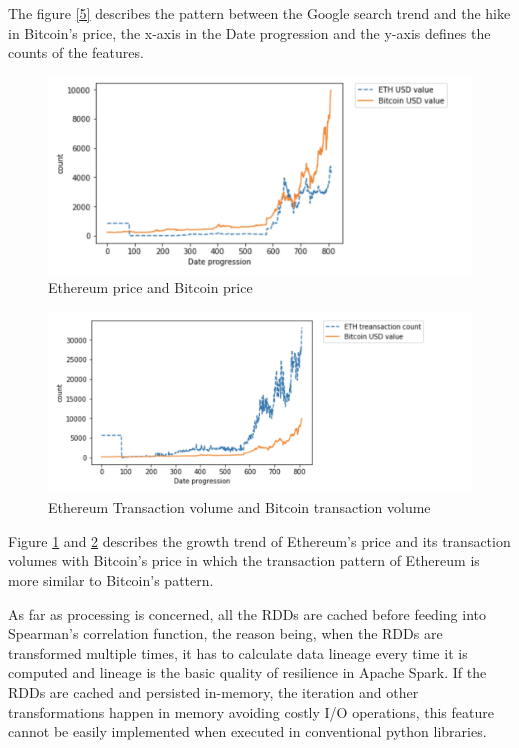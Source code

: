 \documentclass[sigconf]{acmart}
\begin{document}
The figure \ref{5} describes the pattern between the Google search trend and the hike in Bitcoin's price, the x-axis in the Date progression and the y-axis defines the counts of the features. 

\begin{figure}[!ht]
  \centering\includegraphics[width=\columnwidth]{images/ethvalue.png}
  \caption{Ethereum price and Bitcoin price}
  \label{6}
\end{figure}

\begin{figure}[!ht]
  \centering\includegraphics[width=\columnwidth]{images/ethtrancount.png}
  \caption{Ethereum Transaction volume and Bitcoin transaction volume}
  \label{7}
\end{figure}

Figure \ref{6} and \ref{7} describes the growth trend of Ethereum's price and its transaction volumes with Bitcoin's price in which the transaction pattern of Ethereum is more similar to Bitcoin's pattern. 

As far as processing is concerned, all the RDDs are cached before feeding into Spearman's correlation function, the reason being, when the RDDs are transformed multiple times, it has to calculate data lineage every time it is computed and lineage is the basic quality of resilience in Apache Spark. If the RDDs are cached and persisted in-memory, the iteration and other transformations happen in memory avoiding costly I/O operations, this feature cannot be easily implemented when executed in conventional python libraries.
\end{document}
